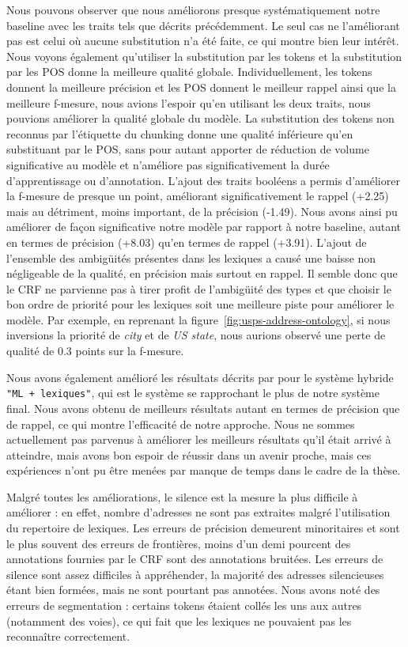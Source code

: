 \documentclass[12pt,a4paper,times,twoside,openright]{report}
\begin{document}
Nous pouvons observer que nous améliorons presque systématiquement notre baseline avec les traits tels que décrits précédemment. Le seul cas ne l'améliorant pas est celui où aucune substitution n'a été faite, ce qui montre bien leur intérêt. Nous voyons également qu'utiliser la substitution par les tokens et la substitution par les POS donne la meilleure qualité globale. Individuellement, les tokens donnent la meilleure précision et les POS donnent le meilleur rappel ainsi que la meilleure f-mesure, nous avions l'espoir qu'en utilisant les deux traits, nous pouvions améliorer la qualité globale du modèle. La substitution des tokens non reconnus par l'étiquette du chunking donne une qualité inférieure qu'en substituant par le POS, sans pour autant apporter de réduction de volume significative au modèle et n'améliore pas significativement la durée d'apprentissage ou d'annotation. L'ajout des traits booléens a permis d'améliorer la f-mesure de presque un point, améliorant significativement le rappel (+2.25) mais au détriment, moins important, de la précision (-1.49). Nous avons ainsi pu améliorer de façon significative notre modèle par rapport à notre baseline, autant en termes de précision (+8.03) qu'en termes de rappel (+3.91). L'ajout de l'ensemble des ambigüités présentes dans les lexiques a causé une baisse non négligeable de la qualité, en précision mais surtout en rappel. Il semble donc que le CRF ne parvienne pas à tirer profit de l'ambigüité des types et que choisir le bon ordre de priorité pour les lexiques soit une meilleure piste pour améliorer le modèle. Par exemple, en reprenant la figure\ \ref{fig:usps-address-ontology}, si nous inversions la priorité de \emph{city} et de \emph{US state}, nous aurions observé une perte de qualité de 0.3 points sur la f-mesure.

Nous avons également amélioré les résultats décrits par \citet{yu2007high} pour le système hybride \texttt{"ML + lexiques"}, qui est le système se rapprochant le plus de notre système final. Nous avons obtenu de meilleurs résultats autant en termes de précision que de rappel, ce qui montre l'efficacité de notre approche. Nous ne sommes actuellement pas parvenus à améliorer les meilleurs résultats qu'il était arrivé à atteindre, mais avons bon espoir de réussir dans un avenir proche, mais ces expériences n'ont pu être menées par manque de temps dans le cadre de la thèse.

Malgré toutes les améliorations, le silence est la mesure la plus difficile à améliorer : en effet, nombre d'adresses ne sont pas extraites malgré l'utilisation du repertoire de lexiques. Les erreurs de précision demeurent minoritaires et sont le plus souvent des erreurs de frontières, moins d'un demi pourcent des annotations fournies par le CRF sont des annotations bruitées. Les erreurs de silence sont assez difficiles à appréhender, la majorité des adresses silencieuses étant bien formées, mais ne sont pourtant pas annotées. Nous avons noté des erreurs de segmentation : certains tokens étaient collés les uns aux autres (notamment des voies), ce qui fait que les lexiques ne pouvaient pas les reconnaître correctement.
\end{document}
